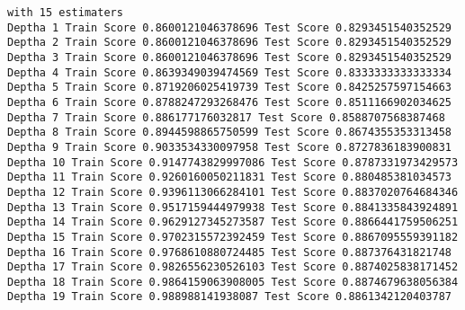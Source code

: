 \documentclass[11pt]{article}
\begin{document}
    \begin{Verbatim}[commandchars=\\\{\}]
with 15 estimaters
Deptha 1 Train Score 0.8600121046378696 Test Score 0.8293451540352529
Deptha 2 Train Score 0.8600121046378696 Test Score 0.8293451540352529
Deptha 3 Train Score 0.8600121046378696 Test Score 0.8293451540352529
Deptha 4 Train Score 0.8639349039474569 Test Score 0.8333333333333334
Deptha 5 Train Score 0.8719206025419739 Test Score 0.8425257597154663
Deptha 6 Train Score 0.8788247293268476 Test Score 0.8511166902034625
Deptha 7 Train Score 0.886177176032817 Test Score 0.8588707568387468
Deptha 8 Train Score 0.8944598865750599 Test Score 0.8674355353313458
Deptha 9 Train Score 0.9033534330097958 Test Score 0.8727836183900831
Deptha 10 Train Score 0.9147743829997086 Test Score 0.8787331973429573
Deptha 11 Train Score 0.9260160050211831 Test Score 0.880485381034573
Deptha 12 Train Score 0.9396113066284101 Test Score 0.8837020764684346
Deptha 13 Train Score 0.9517159444979938 Test Score 0.8841335843924891
Deptha 14 Train Score 0.9629127345273587 Test Score 0.8866441759506251
Deptha 15 Train Score 0.9702315572392459 Test Score 0.8867095559391182
Deptha 16 Train Score 0.9768610880724485 Test Score 0.887376431821748
Deptha 17 Train Score 0.9826556230526103 Test Score 0.8874025838171452
Deptha 18 Train Score 0.9864159063908005 Test Score 0.8874679638056384
Deptha 19 Train Score 0.988988141938087 Test Score 0.8861342120403787

    \end{Verbatim}
\end{document}
